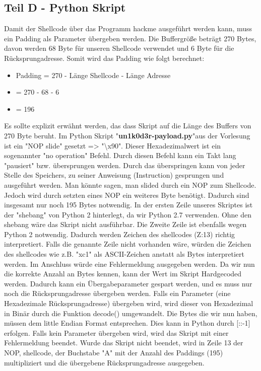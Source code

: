 \documentclass[12pt]{article}
\begin{document}
\subsection{Teil D - Python Skript}
Damit der Shellcode über das Programm hackme ausgeführt werden kann, muss ein Padding als Parameter übergeben werden.\newline
Die Buffergröße beträgt 270 Bytes, davon werden 68 Byte für unseren Shellcode verwendet und 6 Byte für die Rücksprungadresse. Somit wird das Padding wie folgt berechnet:
\begin{itemize}
\item Padding = 270 - Länge Shellcode - Länge Adresse
\item = 270 - 68 - 6
\item = 196
\end{itemize}
Es sollte explizit erwähnt werden, das dass Skript auf die Länge des Buffers von 270 Byte beruht. \newline
\newline
Im Python Skript "\textbf{un1k0d3r-payload.py}"aus der Vorlesung ist ein "NOP slide" gesetzt => "\textbackslash x90". Dieser Hexadezimalwert ist ein sogenannter "no operation" Befehl. Durch diesen Befehl kann ein Takt lang "pausiert" bzw. übersprungen werden. Durch das überspringen kann von jeder Stelle des Speichers, zu seiner Anweisung (Instruction) gesprungen und ausgeführt werden. Man könnte sagen, man slided durch ein NOP zum Shellcode.
\newline
Jedoch wird durch setzten eines NOP ein weiteres Byte benötigt. Dadurch sind insgesamt nur noch 195 Bytes notwendig.\newline
\newline
In der ersten Zeile unseres Skriptes ist der "shebang" von Python 2 hinterlegt, da wir Python 2.7 verwenden. Ohne den shebang wäre das Skript nicht ausführbar. Die Zweite Zeile ist ebenfalls wegen Python 2 notwendig. Dadurch werden Zeichen des shellcodes (Z:13) richtig interpretiert. Falls die genannte Zeile nicht vorhanden wäre, würden die Zeichen des shellcodes wie z.B. "xc1" als ASCII-Zeichen anstatt als Bytes interpretiert werden. Im Anschluss würde eine Fehlermeldung ausgegeben werden.\newline
\newline
Da wir nun die korrekte Anzahl an Bytes kennen, kann der Wert im Skript Hardgecoded werden. Dadurch kann ein Übergabeparameter gespart werden, und es muss nur noch die Rücksprungadresse übergeben werden. \newline
Falls ein Parameter (eine Hexadezimale Rücksprungadresse) übergeben wird, wird dieser von Hexadezimal in Binär durch die Funktion decode() umgewandelt. \newline
Die Bytes die wir nun haben, müssen dem little Endian Format entsprechen. Dies kann in Python durch [::-1] erfolgen.
\newline
Falls kein Parameter übergeben wird, wird das Skript mit einer Fehlermeldung beendet. \newline
\newline
Wurde das Skript nicht beendet, wird in Zeile 13 der NOP, shellcode, der Buchstabe "A" mit der Anzahl des Paddings (195) multipliziert und die übergebene Rücksprungadresse ausgegeben.
\end{document}
